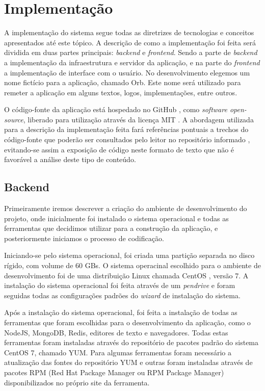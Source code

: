 \chapter{Implementação}
A implementação do sistema segue todas as diretrizes de tecnologias e conceitos apresentados até este tópico. A descrição de como a implementação foi feita será dividida em duas partes principais: \textit{backend} e \textit{frontend}. Sendo a parte de \textit{backend} a implementação da infraestrutura e servidor da aplicação, e na parte do \textit{frontend} a implementação de interface com o usuário. No desenvolvimento elegemos um nome fictício para a aplicação, chamado Orb. Este nome será utilizado para remeter a aplicação em alguns textos, logos, implementações, entre outros.

O código-fonte da aplicação está hospedado no GitHub \cite{orb}, como \textit{software open-source}, liberado para utilização através da licença MIT \cite{mit}. A abordagem utilizada para a descrição da implementação feita fará referências pontuais a trechos do código-fonte que poderão ser consultados pelo leitor no repositório informado \cite{orb}, evitando-se assim a exposição de código neste formato de texto que não é favorável a análise deste tipo de conteúdo.

\section{Backend}
Primeiramente iremos descrever a criação do ambiente de desenvolvimento do projeto, onde inicialmente foi instalado o sistema operacional e todas as ferramentas que decidimos utilizar para a construção da aplicação, e posteriormente iniciamos o processo de codificação.

Iniciando-se pelo sistema operacional, foi criada uma partição separada no disco rígido, com volume de 60 GBs. O sistema operacinal escolhido para o ambiente de desenvolvimento foi de uma distribuição Linux chamada CentOS \cite{centos}, versão 7. A instalação do sistema operacional foi feita através de um \textit{pendrive} e foram seguidas todas as configurações padrões do \textit{wizard} de instalação do sistema.

Após a instalação do sistema operacional, foi feita a instalação de todas as ferramentas que foram escolhidas para o desenvolvimento da aplicação, como o NodeJS, MongoDB, Redis, editores de texto e navegadores. Todas estas ferramentas foram instaladas através do repositório de pacotes padrão do sistema CentOS 7, chamado YUM. Para algumas ferramentas foram necessário a atualização das fontes do repositório YUM e outras foram instaladas através de pacotes RPM (Red Hat Package Manager ou RPM Package Manager) disponibilizados no próprio site da ferramenta.

